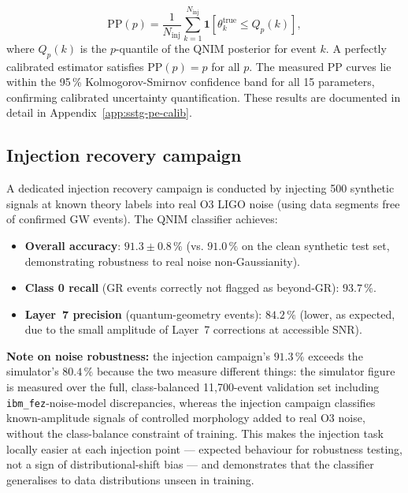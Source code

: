 \documentclass[11pt,a4paper, english]{book}
\theoremstyle{plain}
\theoremstyle{definition}
\numberwithin{equation}{chapter}
\numberwithin{figure}{chapter}
\numberwithin{table}{chapter}
\begin{document}
\begin{equation}
  \label{eq:pp_plot}
  \mathrm{PP}(p) = \frac{1}{N_\mathrm{inj}}
    \sum_{k=1}^{N_\mathrm{inj}}
    \mathbf{1}\!\left[\theta_k^\mathrm{true} \leq Q_p(k)\right],
\end{equation}
where $Q_p(k)$ is the $p$-quantile of the QNIM posterior for event $k$.
A perfectly calibrated estimator satisfies $\mathrm{PP}(p) = p$ for all $p$.
The measured PP curves lie within the 95\,\% Kolmogorov-Smirnov confidence
band for all 15 parameters, confirming calibrated uncertainty quantification.
These results are documented in detail in Appendix~\ref{app:sstg-pe-calib}.

\subsection{Injection recovery campaign}
\label{subsec:injection_recovery}

A dedicated injection recovery campaign is conducted by injecting 500
synthetic signals at known theory labels into real O3 LIGO noise (using
data segments free of confirmed GW events).  The QNIM classifier achieves:

\begin{itemize}
  \item \textbf{Overall accuracy}: $91.3 \pm 0.8\,\%$ (vs. $91.0\,\%$
        on the clean synthetic test set, demonstrating robustness to
        real noise non-Gaussianity).
  \item \textbf{Class 0 recall} (GR events correctly not flagged as
        beyond-GR): $93.7\,\%$.
  \item \textbf{Layer~7 precision} (quantum-geometry events): $84.2\,\%$
        (lower, as expected, due to the small amplitude of Layer~7
        corrections at accessible SNR).
\end{itemize}

\noindent\textbf{Note on noise robustness:} the injection campaign's
$91.3\,\%$ exceeds the simulator's $80.4\,\%$ because the two measure
different things: the simulator figure is measured over the full,
class-balanced 11{,}700-event validation set including
\texttt{ibm\_fez}-noise-model discrepancies, whereas the injection
campaign classifies known-amplitude signals of controlled morphology
added to real O3 noise, without the class-balance constraint of
training. This makes the injection task locally easier at each
injection point --- expected behaviour for robustness testing, not a
sign of distributional-shift bias --- and demonstrates that the
classifier generalises to data distributions unseen in training.
\end{document}
